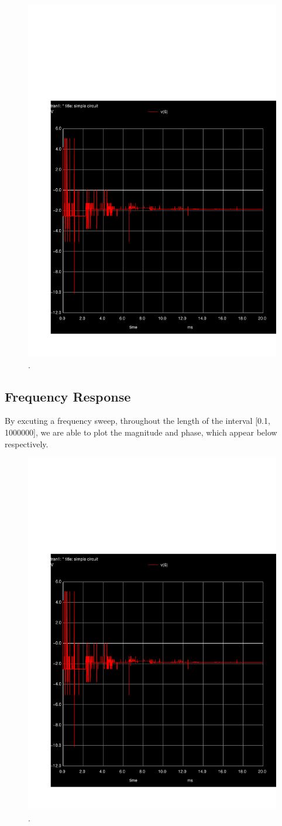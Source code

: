 \begin{figure}[h] \centering
\includegraphics[width=0.6\linewidth]{trans.pdf}
\caption{.}
\label{fig:rc1}
\end{figure}


\subsection{Frequency Response}

By excuting a frequency sweep, throughout the length of the interval [0.1, 1000000], we are able to plot the magnitude and phase, which appear below respectively.
\begin{figure}[h] \centering
\includegraphics[width=0.6\linewidth]{trans.pdf}
\caption{.}
\label{fig:rc1}
\end{figure}



